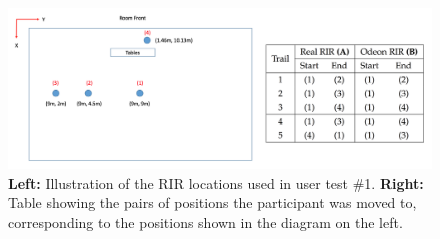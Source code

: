 \documentclass[../../main.tex]{subfiles}
\begin{document}
			\begin{figure}
				\centerline{\includegraphics[width=\textwidth]{Sections/userTesting/images/test1/roomPositionsandResults.png}}
				\caption{\textbf{Left:} Illustration of the \ac{RIR} locations used in user test \#1. \textbf{Right:} Table showing the pairs of positions the participant was moved to, corresponding to the positions shown in the diagram on the left.}
				\label{test1}
			\end{figure}		

\end{document}
